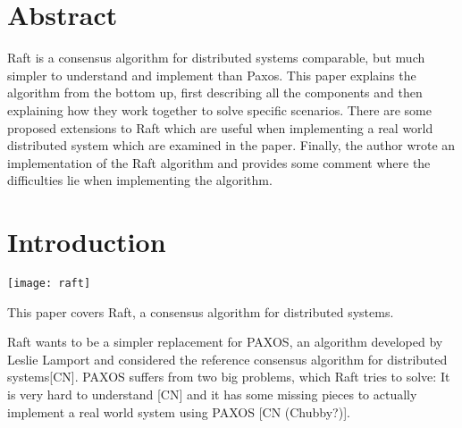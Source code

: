 




\begin{titlepage}
\afterpage{\restorepagecolor}
\newcommand{\colorRule}[3][black]{\textcolor[HTML]{#1}{\rule{#2}{#3}}}
\end{titlepage}
\restoregeometry



{
\hypersetup{linkcolor=}
\setcounter{tocdepth}{3}
\tableofcontents
\pagebreak
}

\section{Abstract}

Raft is a consensus algorithm for distributed systems comparable, but much simpler to understand and implement than Paxos.
This paper explains the algorithm from the bottom up, first describing all the components and
then explaining how they work together to solve specific scenarios.
There are some proposed extensions to Raft which are useful when implementing a real world distributed system which are examined in the paper. Finally, the author wrote an implementation of the Raft algorithm and provides some comment where the difficulties lie when implementing the algorithm.

\section{Introduction}

\texttt{[image: raft]}

This paper covers Raft, a consensus algorithm for distributed systems.

Raft wants to be a simpler replacement for PAXOS, an algorithm developed by Leslie Lamport and considered the reference consensus algorithm for distributed systems[CN]. PAXOS suffers from two big problems, which Raft tries to solve: It is very hard to understand [CN] and it has some missing pieces to actually implement a real world system using PAXOS [CN (Chubby?)].

